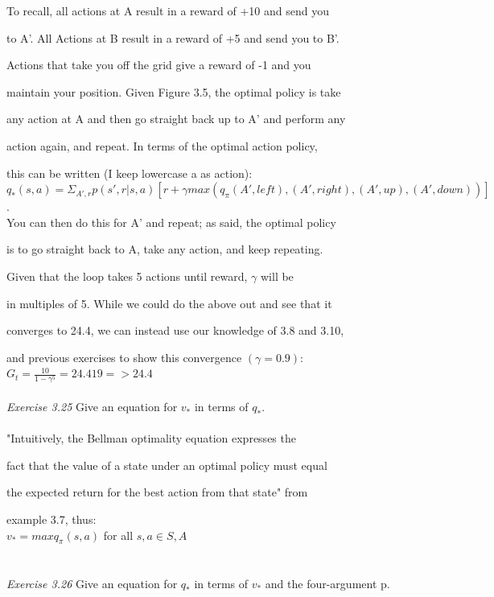 \documentclass{article}
\begin{document}
To recall, all actions at A result in a reward of +10 and send you 

to A'. All Actions at B result in a reward of +5 and send you to B'.

Actions that take you off the grid give a reward of -1 and you 

maintain your position. Given Figure 3.5, the optimal policy is take 

any action at A and then go straight back up to A' and perform any 

action again, and repeat. In terms of the optimal action policy, 

this can be written (I keep lowercase a as action): \\

$q_{*}(s, a) = \Sigma_{A', r}p(s', r|s, a)[r + \gamma max(q_{\pi}(A', left), (A', right), (A', up), (A', down))]$.\\

You can then do this for A' and repeat; as said, the optimal policy

is to go straight back to A, take any action, and keep repeating. 

Given that the loop takes 5 actions until reward, $\gamma$ will be 

in multiples of 5. While we could do the above out and see that it

converges to 24.4, we can instead use our knowledge of 3.8 and 3.10,

and previous exercises to show this convergence $(\gamma = 0.9)$:\\

$G_{t} = \frac{10}{1-\gamma^{5}} = 24.419 => 24.4$
\\
\\
\textit{Exercise 3.25} Give an equation for $v_{*}$ in terms of $q_{*}$. \\
\\

"Intuitively, the Bellman optimality equation expresses the

fact that the value of a state under an optimal policy must equal 

the expected return for the best action from that state" from 

example 3.7, thus: \\

$v_{*} = maxq_{\pi}(s, a)$ for all $s, a \in S, A$\\
\\
\\
\textit{Exercise 3.26} Give an equation for $q_{*}$ in terms of $v_{*}$ and the four-argument p. \\
\\
\end{document}
